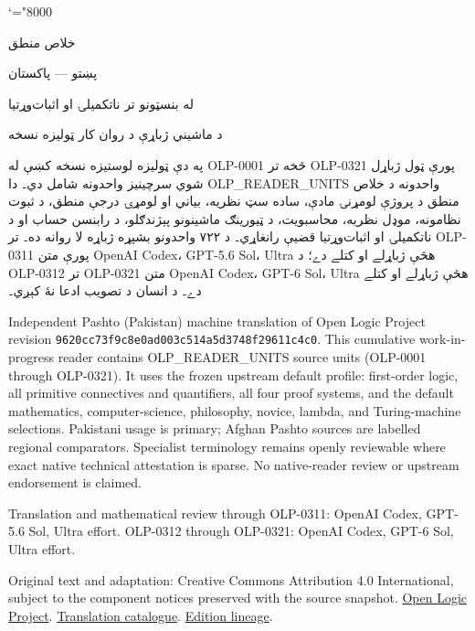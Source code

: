\documentclass[11pt,a4paper,oneside]{report}
\theoremstyle{definition}
\begin{document}
\setRTL
\mathcode`\!="8000
\begin{titlepage}
\thispagestyle{empty}
\begin{center}
\vspace*{22mm}
{\Huge خلاص منطق}\par\bigskip
{\Large پښتو — پاکستان}\par\bigskip
{\LARGE له بنسټونو تر ناتکميلۍ او اثبات‌وړتيا}\par\bigskip
د ماشيني ژباړې د روان کار ټوليزه نسخه
\end{center}
\bigskip
په دې ټوليزه لوستيزه نسخه کښې له OLP-0001 څخه تر OLP-0321 پورې
ټول ژباړل شوي سرچينيز واحدونه شامل دي۔ دا OLP_READER_UNITS واحدونه د
خلاص منطق د پروژې لومړنۍ مادې، ساده سټ نظريه، بياني او لومړۍ درجې
منطق، د ثبوت نظامونه، موډل نظريه، محاسبويت، د ټيورينګ ماشينونو
پېژندګلو، د رابنسن حساب او د ناتکميلۍ او اثبات‌وړتيا قضيې رانغاړي۔
د ۷۲۲ واحدونو بشپړه ژباړه لا روانه ده۔ تر OLP-0311 پورې متن
OpenAI Codex، GPT-5.6 Sol، Ultra هڅې ژباړلے او کتلے دے؛
د OLP-0312 تر OLP-0321 متن OpenAI Codex، GPT-6 Sol، Ultra
هڅې ژباړلے او کتلے دے۔ د انسان د تصويب ادعا نۀ کېږي۔

\begin{LTR}\latinfont\small
Independent Pashto (Pakistan) machine translation of Open Logic Project
revision \texttt{9620cc73f9c8e0ad003c514a5d3748f29611c4c0}. This cumulative
work-in-progress reader contains OLP_READER_UNITS source units (OLP-0001
through OLP-0321). It uses the frozen upstream default profile: first-order
logic, all primitive connectives and quantifiers, all four proof systems,
and the default mathematics, computer-science, philosophy, novice, lambda,
and Turing-machine selections. Pakistani usage is primary; Afghan Pashto
sources are labelled regional comparators. Specialist terminology remains
openly reviewable where exact native technical attestation is sparse. No
native-reader review or upstream endorsement is claimed.

Translation and mathematical review through OLP-0311: OpenAI Codex,
GPT-5.6 Sol, Ultra effort. OLP-0312 through OLP-0321: OpenAI Codex,
GPT-6 Sol, Ultra effort.

Original text and adaptation: Creative Commons Attribution 4.0 International,
subject to the component notices preserved with the source snapshot.
\href{https://openlogicproject.org/}{Open Logic Project}.\quad
\href{https://github.com/KokunoYumeto/OpenLogic-translations}{Translation catalogue}.\quad
\href{https://doi.org/10.5281/zenodo.22307197}{Edition lineage}.
\end{LTR}
\end{titlepage}
\tableofcontents
\clearpage
\end{document}
